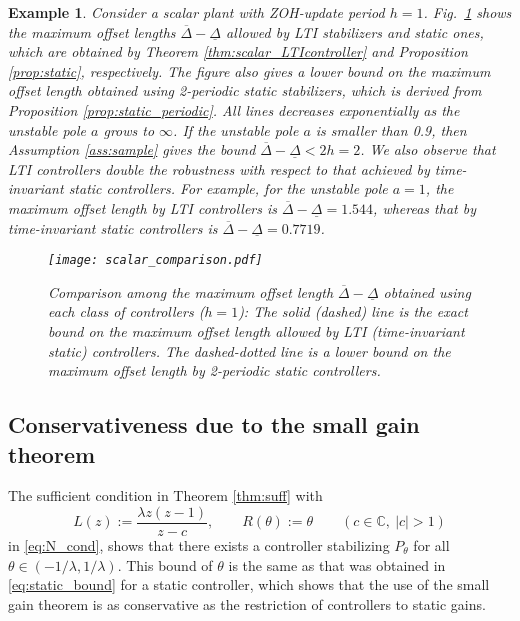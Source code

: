 \documentclass[letterpaper, 12pt, draftcls, onecolumn]{ieeeconf}
\newtheorem{example}[theorem]{Example}
\begin{document}
\begin{example}
		Consider a scalar plant with ZOH-update period $h = 1$. 
		Fig.~\ref{fig:comparison} shows the maximum offset lengths 
		$\overline \Delta - \underline \Delta$ allowed by
		LTI stabilizers and static ones, which are
		obtained by 
		Theorem \ref{thm:scalar_LTIcontroller}
		and
		Proposition \ref{prop:static}, respectively. 
		The figure also 
		gives a lower bound on the maximum offset length obtained
		using 2-periodic static stabilizers,
		which is derived from Proposition \ref{prop:static_periodic}.
		All lines decreases exponentially as the unstable pole 
		$a$ grows to $\infty$.
		If the unstable pole $a$ is smaller than 0.9, then
		Assumption \ref{ass:sample} gives the bound 
		$\overline{\Delta} - \underline{\Delta} < 2h = 2$.
		We also observe that LTI controllers double the robustness 
		with respect to that
		achieved by time-invariant static controllers.
		For example, for the unstable pole $a = 1$,
		the maximum offset length by LTI controllers
		is $\overline \Delta - \underline \Delta = 1.544$,
		whereas that by time-invariant static controllers is 
		$\overline \Delta - \underline \Delta = 0.7719$. 
		
		\begin{figure}[bt]
			\centering
			\texttt{[image: scalar\_comparison.pdf]}
			\caption{Comparison among the maximum offset length 
				$\overline \Delta - \underline \Delta$ obtained using 
				each class of controllers ($h=1$): 
				The solid (dashed) line is the exact
				bound on the maximum offset length allowed by LTI 
				(time-invariant static) controllers.
				The dashed-dotted line is a lower bound on the maximum offset length
				by 2-periodic static controllers.}
			\label{fig:comparison}
		\end{figure}
\end{example}



\subsection{Conservativeness due to the small gain theorem}
The sufficient condition in Theorem \ref{thm:suff} with
\[
L(z) := \frac{\lambda z(z-1)}{z-c},\qquad R(\theta) := \theta
\qquad
(c\in \mathbb{C},~|c| > 1)
\] in
\eqref{eq:N_cond}, shows that 
there exists a controller stabilizing $P_{\theta}$
for all $\theta \in (-1/\lambda, 1/\lambda)$.
This bound of $\theta$ 
is the same as that was obtained in
\eqref{eq:static_bound} for a static controller,
which shows that 
the use of the small gain theorem is as conservative as
the restriction of controllers to static gains.
\end{document}
